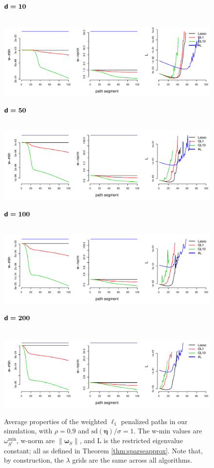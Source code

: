 \documentclass[12pt]{article}
\newcommand{\bs}[1]{\boldsymbol{#1}}
\newcommand{\mr}[1]{\mathrm{#1}}
\begin{document}
\begin{figure}\small
$\boldsymbol{{\sf d} = 10}$

~~~~~~\includegraphics[width=.9\textwidth]{graphs/weights-r09-s1-d10}

$\boldsymbol{{\sf d} = 50}$

~~~~~~\includegraphics[width=.9\textwidth]{graphs/weights-r09-s1-d50}

$\boldsymbol{{\sf d} = 100}$

~~~~~~\includegraphics[width=.9\textwidth]{graphs/weights-r09-s1-d100}

$\boldsymbol{{\sf d} = 200}$

~~~~~~\includegraphics[width=.9\textwidth]{graphs/weights-r09-s1-d200}
\caption{\label{fig:weights} Average properties of the weighted $\ell_1$ penalized paths in our simulation, with $\rho=0.9$ and $\mathrm{sd}(\bs{\eta})/\sigma=1$.
The {\sf\footnotesize w-min} values are $\omega^{\mr{min}}_{S^c}$, {\sf\footnotesize w-norm} are $\|\bs{\omega}_S\|$, and {\sf\footnotesize L} is the restricted eigenvalue constant; all as defined in Theorem \ref{thm:sparseapprox}.  Note that, by construction, the $\lambda$ grids are the same across all algorithms.}  
\end{figure}
\end{document}

